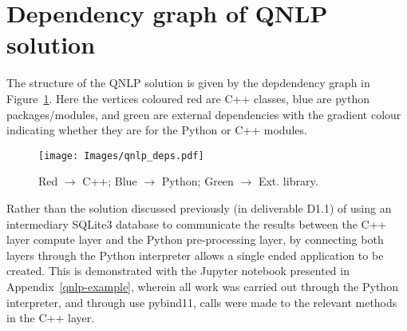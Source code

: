 \section{Dependency graph of QNLP solution}\label{app:dep_graph}
The structure of the QNLP solution is given by the depdendency graph in Figure~\ref{fig:qnlp_deps}. 
Here the vertices coloured red are C++ classes, blue are python packages/modules, and green are external dependencies with the gradient colour indicating whether they are for the Python or C++ modules.

\begin{figure}[h!]
    \centering
    \texttt{[image: Images/qnlp\_deps.pdf]}
    \caption{Red $\rightarrow$ C++; Blue $\rightarrow$  Python; Green $\rightarrow$ Ext. library.}
    \label{fig:qnlp_deps}
\end{figure}

Rather than the solution discussed previously (in deliverable D1.1) of using an intermediary SQLite3 database to communicate the results between the C++ layer compute layer and the Python pre-processing layer, by connecting both layers through the Python interpreter allows a single ended application to be created. This is demonstrated with the Jupyter notebook presented in Appendix~\ref{qnlp-example}, wherein all work was carried out through the Python interpreter, and through use pybind11, calls were made to the relevant methods in the C++ layer.
\clearpage